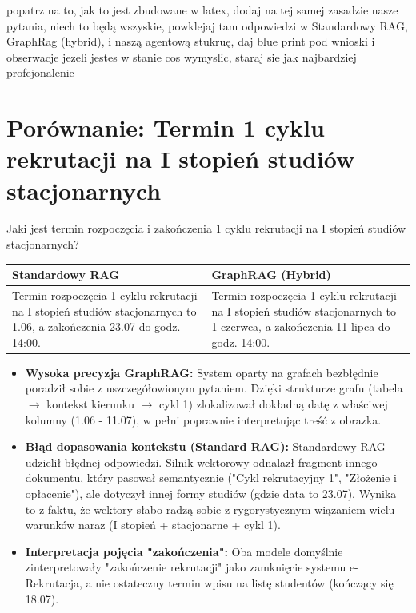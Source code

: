 popatrz na to, jak to jest zbudowane w latex, dodaj na tej samej zasadzie nasze pytania, niech to będą wszyskie, powklejaj tam odpowiedzi w Standardowy RAG, GraphRag (hybrid), i naszą agentową stukruę, daj blue print pod wnioski i obserwacje jezeli jestes w stanie cos wymyslic, staraj sie jak najbardziej profejonalenie \section*{Porównanie: Termin 1 cyklu rekrutacji na I stopień studiów stacjonarnych}

\begin{tcolorbox}[colback=blue!5!white,colframe=blue!75!black,title=Pytanie użytkownika]
    Jaki jest termin rozpoczęcia i zakończenia 1 cyklu rekrutacji na I stopień studiów stacjonarnych?
\end{tcolorbox}

\noindent
\begin{tabularx}{\textwidth}{@{} XX @{}}
    \toprule
    \textbf{Standardowy RAG} & \textbf{GraphRAG (Hybrid)} \\
    \midrule
    \small 
    Termin rozpoczęcia 1 cyklu rekrutacji na I stopień studiów stacjonarnych to 1.06, a zakończenia 23.07 do godz. 14:00.
    & 
    \small 
    Termin rozpoczęcia 1 cyklu rekrutacji na I stopień studiów stacjonarnych to 1 czerwca, a zakończenia 11 lipca do godz. 14:00. \\
    \bottomrule
\end{tabularx}

\begin{tcolorbox}[colback=green!5!white,colframe=green!50!black,title=Wnioski i obserwacje]
    \begin{itemize}
        \item \textbf{Wysoka precyzja GraphRAG:} System oparty na grafach bezbłędnie poradził sobie z uszczegółowionym pytaniem. Dzięki strukturze grafu (tabela $\rightarrow$ kontekst kierunku $\rightarrow$ cykl 1) zlokalizował dokładną datę z właściwej kolumny (1.06 - 11.07), w pełni poprawnie interpretując treść z obrazka.
        \item \textbf{Błąd dopasowania kontekstu (Standard RAG):} Standardowy RAG udzielił błędnej odpowiedzi. Silnik wektorowy odnalazł fragment innego dokumentu, który pasował semantycznie ("Cykl rekrutacyjny 1", "Złożenie i opłacenie"), ale dotyczył innej formy studiów (gdzie data to 23.07). Wynika to z faktu, że wektory słabo radzą sobie z rygorystycznym wiązaniem wielu warunków naraz (I stopień + stacjonarne + cykl 1).
        \item \textbf{Interpretacja pojęcia "zakończenia":} Oba modele domyślnie zinterpretowały "zakończenie rekrutacji" jako zamknięcie systemu e-Rekrutacja, a nie ostateczny termin wpisu na listę studentów (kończący się 18.07).
    \end{itemize}
\end{tcolorbox}
\vspace{1em}


